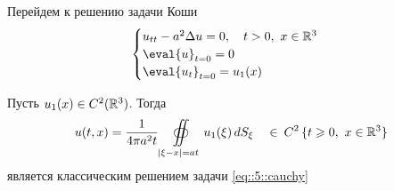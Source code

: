 \documentclass[../main.tex]{subfiles}
\begin{document}

Перейдем к решению задачи Коши
\begin{equation}
\begin{cases}
  u_{tt} - a^2\Delta u = 0,   \quad t>0,\   x \in \R^3 \\
  \eval{ u }_{t=0} = 0   \\
  \eval{u_t}_{t=0} = u_1(x)
\end{cases}
\label{eq::5::cauchy}
\end{equation}

\begin{theorem}
Пусть $u_1(x) \in C^2(\mathbb{R}^3)$. Тогда 
\[
u(t,x) = \frac{1}{4\pi a^2t}
\oiint\limits_{|\xi-x|=at}  u_1(\xi)\,  dS_{\xi}   \quad
\in\: C^2\,   \{t\geqslant 0,\   x \in \mathbb{R}^3 \}
\]
является классическим решением задачи \eqref{eq::5::cauchy}
\end{theorem}
\end{document}
